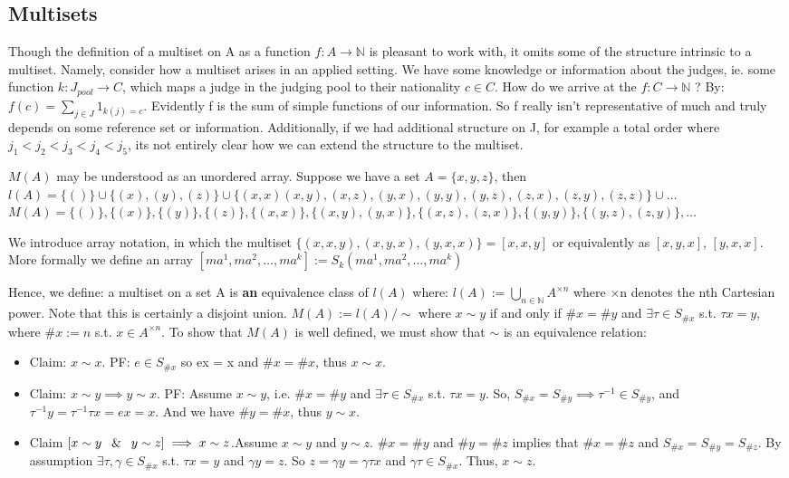 \documentclass{article}
\theoremstyle{definition}
\begin{document}
\subsection{Multisets}
Though the definition of a multiset on A as a function $f:A\rightarrow\mathbb{N}$ is pleasant to work with, it omits some of the structure intrinsic to a multiset. Namely, consider how a multiset arises in an applied setting. We have some knowledge or information about the judges, ie. some function $k: J_{pool} → C$, which maps a judge in the judging pool to their nationality $c\in C$. How do we arrive at the $f:C\rightarrow\mathbb{N}$ ? By: $f(c) = \sum_{j\in J} 1_{k(j)=c}$. Evidently f is the sum of simple functions of our information. So f really isn't representative of much and truly depends on some reference set or information. Additionally, if we had additional structure on J, for example a total order where $j_1<j_2<j_3 <j_4<j_5$, its not entirely clear how we can extend the structure to the multiset.



$M(A)$ may be understood as an unordered array. Suppose we have a set $A = \{x,y,z\}$, then 
$l(A) = \{ () \}\cup \{(x),(y),(z)\} \cup \{(x,x)(x,y),(x,z),(y,x),(y,y),(y,z),(z,x),(z,y),(z,z)\} \cup \dots $
$M(A) = \{()\}, \{(x)\},\{(y)\},\{(z)\} , \{(x,x)\}, \{(x,y),(y,x)\},  \{(x,z),(z,x)\},\{(y,y)\},\{(y,z),(z,y)\}, \dots $

We introduce array notation, in which the multiset $\{(x,x,y),(x,y,x),(y,x,x)\} = [x,x,y]$ or equivalently as $[x,y,x]$, $[y,x,x]$. More formally we define an array $[ma^1,ma^2,\dots, ma^k] := S_k(ma^1,ma^2,\dots,ma^k)$


Hence, we define: a multiset on a set A is \textbf{an} equivalence class of $l(A)$ where:
$l(A):= \bigcup_{n\in\mathbb{N}}A^{×n}$ where ×n denotes the nth Cartesian power. Note that this is certainly a disjoint union.
$M(A) := l(A)/\sim$ where $x\sim y$ if and only if $\#x=\#y $ and $\exists \tau \in S_{\#x}$ s.t. $\tau x=y$, where $\#x:=n $ s.t. $ x\in A^{×n}$. 
To show that $M(A)$ is well defined, we must show that $\sim$ is an equivalence relation:
\begin{itemize}
\item Claim: $x\sim x$. PF: $ e \in S_{\#x}$ so ex = x and $\#x=\#x$, thus $ x\sim x$.
\item Claim: $ x\sim y \implies y\sim x$. PF: Assume $x\sim y$, i.e. $\#x = \#y$ and $ \exists \tau \in S_{\#x} $ s.t. $\tau x = y$. So, $S_{\#x}=S_{\#y} \implies \tau^{-1} \in S_{\#y}$, and $\tau^{-1}y = \tau^{-1}\tau x = ex = x$. And we have $ \#y=\#x$, thus $y\sim x$.
\item Claim $ [x\sim y \:\And\:  y \sim z] \implies x \sim z $.Assume $x\sim y$ and $y\sim z$. $\#x=\#y$ and $\#y=\#z$ implies that $\#x=\#z$ and $S_{\#x}=S_{\#y}=S_{\#z}$. By assumption $\exists \tau, \gamma \in S_{\#x}$ s.t. $\tau x=y$ and $\gamma y=z$. So $z = \gamma y = \gamma \tau x $ and $\gamma\tau \in S_{\#x}$. Thus, $x\sim z$.
\end{itemize}
\end{document}
